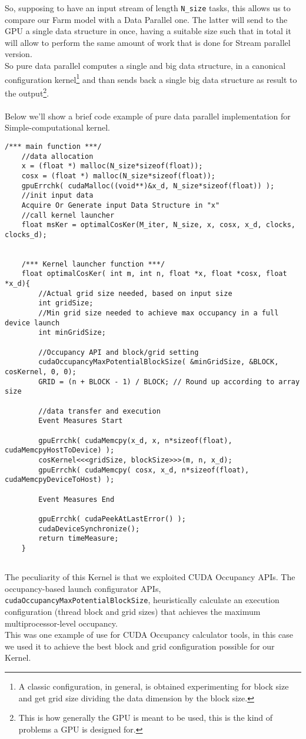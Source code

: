 	So, supposing to have an input stream of length \texttt{N\_size} tasks, this allows us to compare our Farm model with a Data Parallel one. The latter will send to the GPU a single data structure in once, having a suitable size such that in total it will allow to perform the same amount of work that is done for Stream parallel version.\\
	So pure data parallel computes a single and big data structure, in a canonical configuration kernel\footnote{A classic configuration, in general, is obtained experimenting for block size and get grid size dividing the data dimension by the block size.} and than sends back a single big data structure as result to the output\footnote{This is how generally the GPU is meant to be used, this is the kind of problems a GPU is designed for.}.\\\\
	Below we'll show a brief code example of pure data parallel implementation for Simple-computational kernel.
	\begin{lstlisting}[caption={Optimal Kernel caller for Simple-Computation kernel, uses Occupancy APIs to get best Block configuration}]
	/*** main function ***/
	//data allocation
	x = (float *) malloc(N_size*sizeof(float));
	cosx = (float *) malloc(N_size*sizeof(float));
	gpuErrchk( cudaMalloc((void**)&x_d, N_size*sizeof(float)) );
	//init input data
	Acquire Or Generate input Data Structure in "x" 
	//call kernel launcher
	float msKer = optimalCosKer(M_iter, N_size, x, cosx, x_d, clocks, clocks_d); 		
	
		
	/*** Kernel launcher function ***/
	float optimalCosKer( int m, int n, float *x, float *cosx, float *x_d){
		//Actual grid size needed, based on input size 
		int gridSize;    
		//Min grid size needed to achieve max occupancy in a full device launch
		int minGridSize;  
	
		//Occupancy API and block/grid setting
		cudaOccupancyMaxPotentialBlockSize( &minGridSize, &BLOCK, cosKernel, 0, 0); 
		GRID = (n + BLOCK - 1) / BLOCK; // Round up according to array size 
	
		//data transfer and execution 	
		Event Measures Start
	 
		gpuErrchk( cudaMemcpy(x_d, x, n*sizeof(float), cudaMemcpyHostToDevice) ); 		
		cosKernel<<<gridSize, blockSize>>>(m, n, x_d);		
		gpuErrchk( cudaMemcpy( cosx, x_d, n*sizeof(float), cudaMemcpyDeviceToHost) );
		
		Event Measures End
	
		gpuErrchk( cudaPeekAtLastError() );		
		cudaDeviceSynchronize();	
		return timeMeasure;	
	}
			
	\end{lstlisting}
	The peculiarity of this Kernel is that we exploited CUDA Occupancy APIs.
	The occupancy-based launch configurator APIs, \texttt{cudaOccupancyMaxPotentialBlockSize}, heuristically calculate an execution configuration (thread block and grid sizes) that achieves the maximum multiprocessor-level occupancy\cite{cudaguide}.\\
	This was one example of use for CUDA Occupancy calculator tools, in this case we used it to achieve the best block and grid configuration possible for our Kernel.
	
